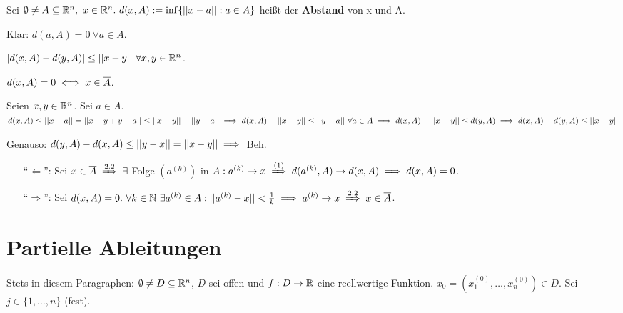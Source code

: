 \documentclass[a4paper,twoside,DIV15,BCOR12mm]{scrbook}
\begin{document}
\begin{definition*}
Sei $\emptyset \ne A \subseteq \mathbb{R}^n,\ x \in \mathbb{R}^n.\ d(x,A) := \inf\{||x-a||:a \in A\}$ heißt der \textbf{Abstand} von x und A.

Klar: $d(a,A) = 0\ \forall a \in A$.
\end{definition*}

\begin{satz}
\begin{liste}
\item $|d(x,A) - d(y,A)| \le ||x-y||\ \forall x,y \in \mathbb{R}^n$.
\item $d(x,A) = 0 \iff x \in \overline{A}$.
\end{liste}
\end{satz}

\begin{beweise}
\item Seien $x,y \in \mathbb{R}^n$. Sei $a \in A$. $d(x,A) \le ||x-a|| = ||x-y+y-a|| \le ||x-y||+||y-a||\\
\implies d(x,A)-||x-y|| \le ||y-a||\ \forall a \in A\\
\implies d(x,A) - ||x-y|| \le d(y,A)\\
\implies d(x,A) - d(y,A) \le ||x-y||$

Genauso: $d(y,A) - d(x,A) \le ||y-x|| = ||x-y|| \implies$ Beh.
\item \begin{itemize}
\item["`$\Leftarrow$"':] Sei $x \in \overline{A} \folgtnach{2.2} \exists$ Folge $(a^{(k)})$ in $A: a^{(k)} \to x \folgtnach{(1)} d(a^{(k)},A) \to d(x,A) \folgt d(x,A) = 0$.
\item["`$\Rightarrow$"':] Sei $d(x,A) = 0.\ \forall k \in \MdN\ \exists a^{(k)} \in A: ||a^{(k)} - x|| < \frac{1}{k} \folgt a^{(k)} \to x \folgtnach{2.2} x \in \overline{A}$.
\end{itemize}
\end{beweise}



\chapter{Partielle Ableitungen}

Stets in diesem Paragraphen: $\emptyset\ne D\subseteq \mathbb{R}^n$, $D$ sei offen und $f:D\to\mathbb{R}$ eine reellwertige Funktion. $x_0 = (x_1^{(0)}, \ldots, x_n^{(0)}) \in D$. Sei $j\in\{1,\ldots,n\}$ (fest).
\end{document}
